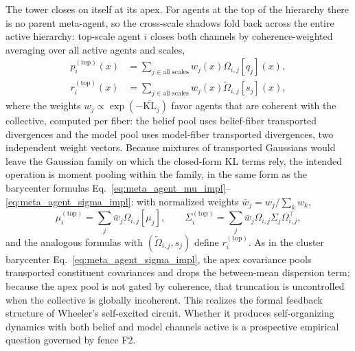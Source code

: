 \documentclass[11pt]{article}
\begin{document}
The tower closes on itself at its apex. For agents at the top of the hierarchy there is no parent meta-agent, so the cross-scale shadows fold back across the entire active hierarchy: top-scale agent $i$ closes both channels by coherence-weighted averaging over all active agents and scales,
\begin{align}
p_i^{(\text{top})}(x) &= \sum_{j \in \text{all scales}} w_j(x)  \Omega_{i,j}[q_j](x), \\
r_i^{(\text{top})}(x) &= \sum_{j \in \text{all scales}} w_j(x)  \tilde\Omega_{i,j}[s_j](x),
\end{align}
where the weights $w_j \propto \exp(-\overline{\mathrm{KL}}_j)$ favor agents that are coherent with the collective, computed per fiber: the belief pool uses belief-fiber transported divergences and the model pool uses model-fiber transported divergences, two independent weight vectors. Because mixtures of transported Gaussians would leave the Gaussian family on which the closed-form KL terms rely, the intended operation is moment pooling within the family, in the same form as the barycenter formulas Eq.~\eqref{eq:meta_agent_mu_impl}--\eqref{eq:meta_agent_sigma_impl}: with normalized weights $\bar{w}_j = w_j / \sum_k w_k$,
\begin{equation}
\mu_i^{(\text{top})} = \sum_j \bar{w}_j  \Omega_{i,j}[\mu_j],
\qquad
\Sigma_i^{(\text{top})} = \sum_j \bar{w}_j  \Omega_{i,j} \Sigma_j \Omega_{i,j}^\top,
\end{equation}
and the analogous formulas with $(\tilde\Omega_{i,j},s_j)$ define $r_i^{(\mathrm{top})}$. As in the cluster barycenter Eq.~\eqref{eq:meta_agent_sigma_impl}, the apex covariance pools transported constituent covariances and drops the between-mean dispersion term; because the apex pool is not gated by coherence, that truncation is uncontrolled when the collective is globally incoherent. This realizes the formal feedback structure of Wheeler's self-excited circuit. Whether it produces self-organizing dynamics with both belief and model channels active is a prospective empirical question governed by fence F2.
\end{document}

